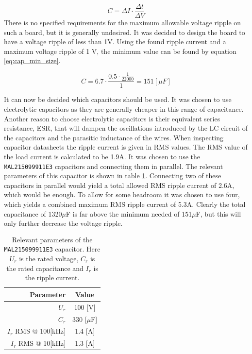 \begin{equation} 
	C = \Delta I \cdot \frac{\Delta t}{\Delta V}
	\label{eq:cap_min}
\end{equation}
There is no specified requirements for the maximum allowable voltage ripple on such a board, but it is generally undesired.
It was decided to design the board to have a voltage ripple of less than 1V.
Using the found ripple current and a maximum voltage ripple of 1 V, the minimum value can be found by equation \ref{eq:cap_min_size}.

\begin{equation} 
	C = 6.7 \cdot \frac{0.5 \cdot \frac{1}{22000}}{1 } = 151 [\mu F]
	\label{eq:cap_min_size}
\end{equation}

It can now be decided which capacitors should be used.
It was chosen to use electrolytic capacitors as they are generally cheaper in this range of capacitance. 
Another reason to choose electrolytic capacitors is their equivalent series resistance, ESR, that will dampen the oscillations introduced by the LC circuit of the capacitors and the parasitic inductance of the wires.
When inspecting capacitor datasheets the ripple current is given in RMS values. 
The RMS value of the load current is calculated to be 1.9A.
It was chosen to use the \texttt{MAL215099911E3} \cite{sup_cap} capacitors and connecting them in parallel. 
The relevant parameters of this capacitor is shown in table \ref{tab:cap_parameters}.
Connecting two of these capacitors in parallel would yield a total allowed RMS ripple current of 2.6A, which would be enough.
To allow for some headroom it was chosen to use four, which yields a combined maximum RMS ripple current of 5.3A. 
Clearly the total capacitance of 1320$\mu$F is far above the minimum needed of 151$\mu$F, but this will only further decrease the voltage ripple.

\begin{table}[tb]
	\centering
	\begin{tabular}{|r|c|}
	\hline
		\textbf{Parameter} & \textbf{Value} \\
	\hline
		$U_r$ & 100 [V]  \\ \hline
		$C_r$ & 330 [$\mu$F]  \\ \hline
		$I_r$ RMS @ 100[kHz] & 1.4 [A]  \\ \hline
		$I_r$ RMS @ 10[kHz] & 1.3 [A]  \\ \hline
		
	\end{tabular}
	\caption[Relevant parameters of the \texttt{MAL215099911E3} capacitor.]{Relevant parameters of the \texttt{MAL215099911E3} capacitor.
	Here $U_r$ is the rated voltage, $C_r$ is the rated capacitance and $I_r$ is the ripple current.}
	\label{tab:cap_parameters}
\end{table}

